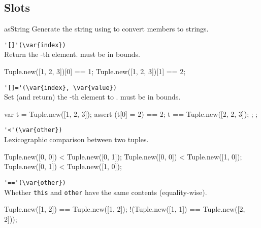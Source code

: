 \subsection{Slots}
\begin{urbiscriptapi}
\item[asString]
  Generate the string  using
   to convert members to strings.

\item \lstinline|'[]'(\var{index})|\\
  Return the -th element.   must be in bounds.
\begin{urbiassert}
Tuple.new([1, 2, 3])[0] == 1;
Tuple.new([1, 2, 3])[1] == 2;
\end{urbiassert}

\item \lstinline|'[]='(\var{index}, \var{value})|\\
  Set (and return) the -th element to .
   must be in bounds.
\begin{urbiscript}
{
  var t = Tuple.new([1, 2, 3]);
  assert
  {
    (t[0] = 2) == 2;
    t == Tuple.new([2, 2, 3]);
  };
};
\end{urbiscript}

\item \lstinline|'<'(\var{other})|\\
  Lexicographic comparison between two tuples.
\begin{urbiassert}
Tuple.new([0, 0]) < Tuple.new([0, 1]);
Tuple.new([0, 0]) < Tuple.new([1, 0]);
Tuple.new([0, 1]) < Tuple.new([1, 0]);
\end{urbiassert}

\item \lstinline|'=='(\var{other})|\\
  Whether \lstinline|this| and \lstinline|other| have the same
  contents (equality-wise).
\begin{urbiassert}
  Tuple.new([1, 2]) == Tuple.new([1, 2]);
!(Tuple.new([1, 1]) == Tuple.new([2, 2]));
\end{urbiassert}
\end{urbiscriptapi}




